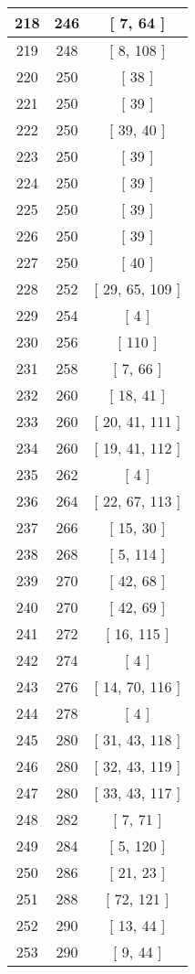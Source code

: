\begin{center}
\begin{longtable}[H]{|| c c c ||}
\hline
218 & 246 & [ 7, 64 ] \\ 
\hline
219 & 248 & [ 8, 108 ] \\ 
\hline
220 & 250 & [ 38 ] \\ 
\hline
221 & 250 & [ 39 ] \\ 
\hline
222 & 250 & [ 39, 40 ] \\ 
\hline
223 & 250 & [ 39 ] \\ 
\hline
224 & 250 & [ 39 ] \\ 
\hline
225 & 250 & [ 39 ] \\ 
\hline
226 & 250 & [ 39 ] \\ 
\hline
227 & 250 & [ 40 ] \\ 
\hline
228 & 252 & [ 29, 65, 109 ] \\ 
\hline
229 & 254 & [ 4 ] \\ 
\hline
230 & 256 & [ 110 ] \\ 
\hline
231 & 258 & [ 7, 66 ] \\ 
\hline
232 & 260 & [ 18, 41 ] \\ 
\hline
233 & 260 & [ 20, 41, 111 ] \\ 
\hline
234 & 260 & [ 19, 41, 112 ] \\ 
\hline
235 & 262 & [ 4 ] \\ 
\hline
236 & 264 & [ 22, 67, 113 ] \\ 
\hline
237 & 266 & [ 15, 30 ] \\ 
\hline
238 & 268 & [ 5, 114 ] \\ 
\hline
239 & 270 & [ 42, 68 ] \\ 
\hline
240 & 270 & [ 42, 69 ] \\ 
\hline
241 & 272 & [ 16, 115 ] \\ 
\hline
242 & 274 & [ 4 ] \\ 
\hline
243 & 276 & [ 14, 70, 116 ] \\ 
\hline
244 & 278 & [ 4 ] \\ 
\hline
245 & 280 & [ 31, 43, 118 ] \\ 
\hline
246 & 280 & [ 32, 43, 119 ] \\ 
\hline
247 & 280 & [ 33, 43, 117 ] \\ 
\hline
248 & 282 & [ 7, 71 ] \\ 
\hline
249 & 284 & [ 5, 120 ] \\ 
\hline
250 & 286 & [ 21, 23 ] \\ 
\hline
251 & 288 & [ 72, 121 ] \\ 
\hline
252 & 290 & [ 13, 44 ] \\ 
\hline
253 & 290 & [ 9, 44 ] \\ 

\end{longtable}
\end{center}
